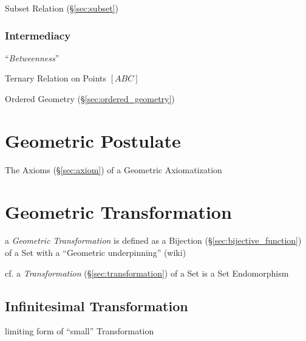 \fist Subset Relation (\S\ref{sec:subset})



\subsubsection{Intermediacy}\label{sec:intermediacy}

``\emph{Betweenness}''

Ternary Relation on Points $[ABC]$

Ordered Geometry (\S\ref{sec:ordered_geometry})



\section{Geometric Postulate}\label{sec:geometric_postulate}

The Axioms (\S\ref{sec:axiom}) of a Geometric Axiomatization



\section{Geometric Transformation}\label{sec:geometric_transformation}


a \emph{Geometric Transformation} is defined as a Bijection
(\S\ref{sec:bijective_function}) of a Set with a ``Geometric underpinning''
(wiki)

cf. a \emph{Transformation} (\S\ref{sec:transformation}) of a Set is a Set
Endomorphism



\subsection{Infinitesimal Transformation}
\label{sec:infinitesimal_transformation}

limiting form of ``small'' Transformation

